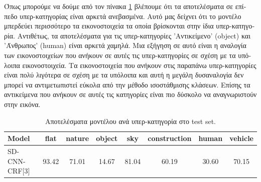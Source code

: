 \begin{table}[H]
  \begin{adjustwidth}{-1.5cm}{}
    \caption[\textgreek{Αποτέλεσμα μοντέλου ανά κατηγορία}]{\textgreek{Αποτελέσματα για κάθε κατηγορία από τον }server \textgreek{της βάσης με την μετρική} IoU (\%).}\label{table:results_table_4}
  \end{adjustwidth}
\end{table}

\textgreek{Όπως μπορούμε να δούμε από τον πίνακα }\ref{table:results_table_5} \textgreek{βλέπουμε ότι τα αποτελέσματα σε επίπεδο υπερ-κατηγορίας είναι αρκετά ανεβασμένα. Αυτό μας δείχνει ότι το μοντέλο μπερδεύει περισσότερο τα εικονοστοιχεία τα οποία βρίσκονται στην ίδια υπερ-κατηγορία. Αντιθέτως, τα αποτελέσματα για τις υπερ-κατηγορίες 'Αντικείμενο' }(object) \textgreek{και 'Άνθρωπος'} (human) \textgreek{είναι αρκετά χαμηλά. Μια εξήγηση σε αυτό είναι η αναλογία των εικονοστοιχείων που ανήκουν σε αυτές τις υπερ-κατηγορίες σε σχέση με τα υπόλοιπα εικονοστοιχεία. Τα εικονοστοιχεία που ανήκουν στις παραπάνω υπερ-κατηγορίες είναι πολύ λιγότερα σε σχέση με τα υπόλοιπα και αυτή η μεγάλη δυσαναλογία δεν μπορεί να αντιμετωπιστεί εύκολα από την μέθοδο ισοστάθμισης κλάσεων. Επίσης τα αντικείμενα που ανήκουν σε αυτές τις κατηγορίες είναι πιο δύσκολο να αναγνωριστούν στην εικόνα.}

\begin{table}[H]
 \begin{tabular}{l|ccccccc}
  \hline
  \textbf{Model} & flat & nature & object & sky & construction & human & vehicle \\ \hline
    SD-CNN-CRF{[}3{]} & 93.42 & 71.01 & 14.67 & 81.04 & 60.19 & 30.60 & 70.15
 \end{tabular}
  \caption[\textgreek{Αποτέλεσμα ανά υπερ-κατηγορία}]{\textgreek{Αποτελέσματα μοντέλου ανά υπερ-κατηγορία στο }test set.}\label{table:results_table_5}
\end{table}


